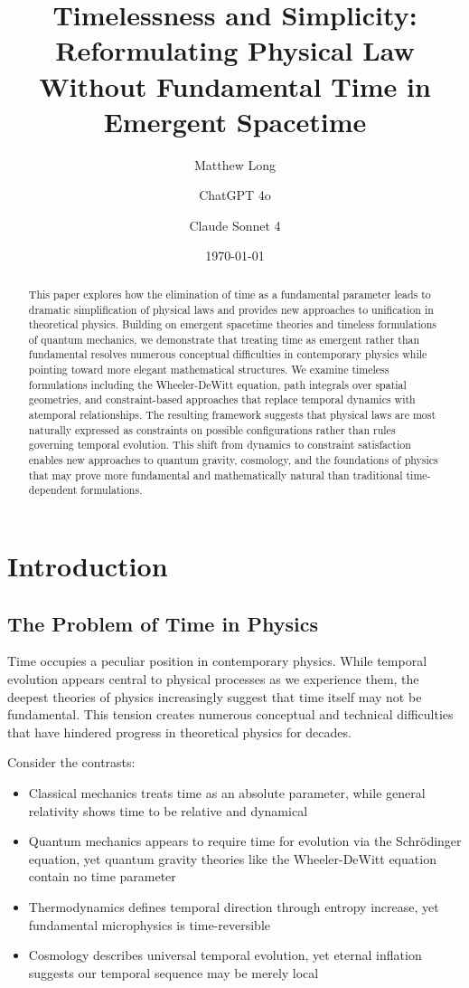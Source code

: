 \documentclass[12pt]{article}
\title{Timelessness and Simplicity: Reformulating Physical Law Without Fundamental Time in Emergent Spacetime}
\author[1]{Matthew Long}
\author[2]{ChatGPT 4o}
\author[3]{Claude Sonnet 4}
\affil[1]{Yoneda AI}
\affil[2]{OpenAI}
\affil[3]{Anthropic}
\date{\today}
\begin{document}
\maketitle

\begin{abstract}
This paper explores how the elimination of time as a fundamental parameter leads to dramatic simplification of physical laws and provides new approaches to unification in theoretical physics. Building on emergent spacetime theories and timeless formulations of quantum mechanics, we demonstrate that treating time as emergent rather than fundamental resolves numerous conceptual difficulties in contemporary physics while pointing toward more elegant mathematical structures. We examine timeless formulations including the Wheeler-DeWitt equation, path integrals over spatial geometries, and constraint-based approaches that replace temporal dynamics with atemporal relationships. The resulting framework suggests that physical laws are most naturally expressed as constraints on possible configurations rather than rules governing temporal evolution. This shift from dynamics to constraint satisfaction enables new approaches to quantum gravity, cosmology, and the foundations of physics that may prove more fundamental and mathematically natural than traditional time-dependent formulations.
\end{abstract}

\onehalfspacing

\tableofcontents

\newpage

\section{Introduction}

\subsection{The Problem of Time in Physics}

Time occupies a peculiar position in contemporary physics. While temporal evolution appears central to physical processes as we experience them, the deepest theories of physics increasingly suggest that time itself may not be fundamental. This tension creates numerous conceptual and technical difficulties that have hindered progress in theoretical physics for decades.

Consider the contrasts:
\begin{itemize}
\item Classical mechanics treats time as an absolute parameter, while general relativity shows time to be relative and dynamical
\item Quantum mechanics appears to require time for evolution via the Schrödinger equation, yet quantum gravity theories like the Wheeler-DeWitt equation contain no time parameter
\item Thermodynamics defines temporal direction through entropy increase, yet fundamental microphysics is time-reversible
\item Cosmology describes universal temporal evolution, yet eternal inflation suggests our temporal sequence may be merely local
\end{itemize}
\end{document}

